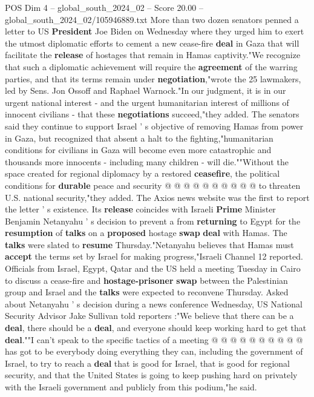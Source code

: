 \begin{textsample}{POS Dim 4 – global\_south\_2024\_02 – Score 20.00 – global\_south\_2024\_02/105946889.txt}  \label{ex:f4_pos_078}
More than two dozen senators penned a letter to US \textbf{President} Joe Biden on Wednesday where they urged him to exert the utmost diplomatic efforts to cement a new cease-fire \textbf{deal} in Gaza that will facilitate the \textbf{release} of hostages that remain in Hamas captivity."We recognize that such a diplomatic achievement will require the \textbf{agreement} of the warring parties, and that its terms remain under \textbf{negotiation},"wrote the 25 lawmakers, led by Sens.
Jon Ossoff and Raphael Warnock."In our judgment, it is in our urgent national interest - and the urgent humanitarian interest of millions of innocent civilians - that these \textbf{negotiations} succeed,"they added.
The senators said they continue to support Israel ' s objective of removing Hamas from power in Gaza, but recognized that absent a halt to the fighting,"humanitarian conditions for civilians in Gaza will become even more catastrophic and thousands more innocents - including many children - will die.""Without the space created for regional diplomacy by a restored \textbf{ceasefire}, the political conditions for \textbf{durable} peace and security @ @ @ @ @ @ @ @ @ @ to threaten U.S. national security,"they added.
The Axios news website was the first to report the letter ' s existence.
Its \textbf{release} coincides with Israeli \textbf{Prime} Minister Benjamin Netanyahu ' s decision to prevent a from \textbf{returning} to Egypt for the \textbf{resumption} of \textbf{talks} on a \textbf{proposed} hostage \textbf{swap} \textbf{deal} with Hamas.
The \textbf{talks} were slated to \textbf{resume} Thursday."Netanyahu believes that Hamas must \textbf{accept} the terms set by Israel for making progress,"Israeli Channel 12 reported.
Officials from Israel, Egypt, Qatar and the US held a meeting Tuesday in Cairo to discuss a cease-fire and \textbf{hostage-prisoner} \textbf{swap} between the Palestinian group and Israel and the \textbf{talks} were expected to reconvene Thursday.
Asked about Netanyahu ' s decision during a news conference Wednesday, US National Security Advisor Jake Sullivan told reporters :"We believe that there can be a \textbf{deal}, there should be a \textbf{deal}, and everyone should keep working hard to get that \textbf{deal}.""I can't speak to the specific tactics of a meeting @ @ @ @ @ @ @ @ @ @ has got to be everybody doing everything they can, including the government of Israel, to try to reach a \textbf{deal} that is good for Israel, that is good for regional security, and that the United States is going to keep pushing hard on privately with the Israeli government and publicly from this podium,"he said.

\end{textsample}

